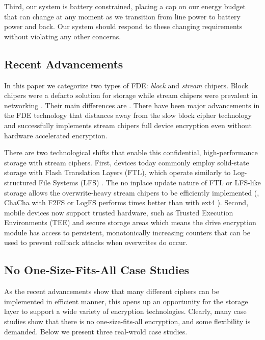 Third, our system is battery constrained, placing a cap on our energy
budget that can change at any moment as we transition from line power to
battery power and back.  Our system should respond to these changing
requirements without violating any other concerns.



\subsection{Recent Advancements}

In this paper we categorize two types of FDE: {\em block} and {\em stream} chipers.
Block chipers were a defacto solution for storage while stream chipers
were prevalent in networking .  Their main differences are
.
There have been major advancements in the FDE
technology that distances away from the slow block cipher technology and
successfully implements stream chipers full device encryption
\cite{Adiantum, StrongBox} even without hardware
accelerated encryption.  


There are two technological shifts that enable this confidential,
high-performance storage with stream ciphers.  First, devices today
commonly employ solid-state storage with Flash Translation Layers (FTL),
which operate similarly to Log-structured File Systems (LFS) \cite{21, 22,
  27-fromStrongBox}.  The no inplace update nature of FTL or LFS-like
storage allows the overwrite-heavy stream chipers to be efficiently
implemented (\eg, ChaCha with F2FS or LogFS performs \xxx times better
than with ext4 \cite{StrongBox}).  Second, mobile devices now support
trusted hardware, such as Trusted Execution Environments (TEE) \cite{24,
  29-fromStrongBox} and secure storage areas \cite{10-fromStrongBox} which
means the drive encryption module has access to persistent, monotonically
increasing counters that can be used to prevent rollback attacks when
overwrites do occur.


\subsection{No One-Size-Fits-All Case Studies}

As the recent advancements show that many different ciphers can be
implemented in efficient manner, this opens up an opportunity for the
storage layer to support a wide variety of encryption technologies.
Clearly, many case studies show that there is no one-size-fits-all
encryption, and some flexibility is demanded.  Below we present three
real-wrold case studies.

